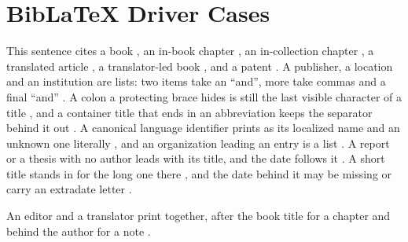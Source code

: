 \documentclass[acmsmall,nonacm,natbib=false]{acmart}
\begin{document}
\thispagestyle{empty}

\section*{BibLaTeX Driver Cases}
This sentence cites a book \cite{DriverBook}, an in-book chapter
\cite{DriverInbook}, an in-collection chapter \cite{DriverIncollection}, a
translated article \cite{DriverTranslatedArticle}, a translator-led book
\cite{DriverTranslatorBook}, and a patent \cite{DriverPatent}.
A publisher, a location and an institution are lists: two items take an ``and'', more take commas and a final ``and'' \cite{DriverPublishers,DriverInstitutions}.
A colon a protecting brace hides is still the last visible character of a title \cite{DriverProtectedColon,DriverDoubledColon,DriverProtectedMain}, and a container title that ends in an abbreviation keeps the separator behind it out \cite{DriverAbbrevBook,DriverAbbrevPages}.
A canonical language identifier prints as its localized name and an unknown one literally \cite{DriverLanguages}, and an organization leading an entry is a list \cite{DriverOrgLead}.
A report or a thesis with no author leads with its title, and the date follows it \cite{DriverNamelessReport,DriverNamelessThesis}.
A short title stands in for the long one there \cite{DriverShortReport}, and the date behind it may be missing \cite{DriverDatelessReport} or carry an extradate letter \cite{DriverSharedReportA,DriverSharedReportB}.

An editor and a translator print together, after the book title for a chapter and behind the author for a note \cite{DriverInbookTranslated,DriverCollectionTranslated,DriverMiscTranslated}.

\printbibliography
\end{document}
